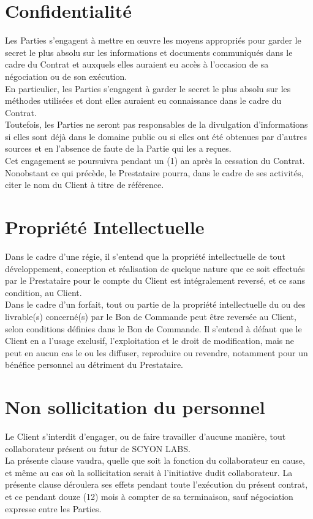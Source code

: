 \documentclass[8pt,french]{base}
\def \companyname {SCYON LABS}
\begin{document}
\begin{multicols*}{3}
\section{Confidentialité}

Les Parties s’engagent à mettre en œuvre les moyens appropriés pour garder le secret le plus absolu sur les informations et documents communiqués dans le cadre du Contrat et auxquels elles auraient eu accès à l’occasion de sa négociation ou de son exécution. \\
En particulier, les Parties s’engagent à garder le secret le plus absolu sur les méthodes utilisées et dont elles auraient eu connaissance dans le cadre du Contrat. \\
Toutefois, les Parties ne seront pas responsables de la divulgation d’informations si elles sont déjà dans le domaine public ou si elles ont été obtenues par d’autres sources et en l’absence de faute de la Partie qui les a reçues. \\
Cet engagement se poursuivra pendant un (1) an après la cessation du Contrat. \\
Nonobstant ce qui précède, le Prestataire pourra, dans le cadre de ses activités, citer le nom du Client à titre de référence.

\section{Propriété Intellectuelle}

Dans le cadre d'une régie, il s'entend que la propriété intellectuelle de tout développement, conception et réalisation de quelque nature que ce soit effectués par le Prestataire pour le compte du Client est intégralement reversé, et ce sans condition, au Client. \\
Dans le cadre d'un forfait, tout ou partie de la propriété intellectuelle du ou des livrable(s) concerné(s) par le Bon de Commande peut être reversée au Client, selon conditions définies dans le Bon de Commande. Il s'entend à défaut que le Client en a l'usage exclusif, l'exploitation et le droit de modification, mais ne peut en aucun cas le ou les diffuser, reproduire ou revendre, notamment pour un bénéfice personnel au détriment du Prestataire.

\section{Non sollicitation du personnel}

Le Client s'interdit d'engager, ou de faire travailler d'aucune manière, tout collaborateur présent ou futur de \companyname. \\
La présente clause vaudra, quelle que soit la fonction du collaborateur en cause, et même au cas où la sollicitation serait à l'initiative dudit collaborateur. La présente clause déroulera ses effets pendant toute l'exécution du présent contrat, et ce pendant douze (12) mois à compter de sa terminaison, sauf négociation expresse entre les Parties.


\end{multicols*}
\end{document}
